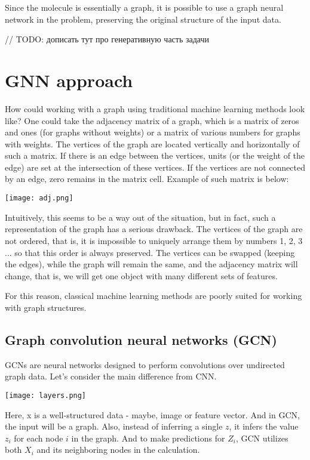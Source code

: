 \documentclass[a4paper,14pt]{article}
\begin{document}
Since the molecule is essentially a graph, it is possible to use a graph neural network in the problem, preserving the original structure of the input data.

// TODO: дописать тут про генеративную часть задачи

\section{GNN approach}

How could working with a graph using traditional machine learning methods look like? One could take the adjacency matrix of a graph, which is a matrix of zeros and ones (for graphs without weights) or a matrix of various numbers for graphs with weights. The vertices of the graph are located vertically and horizontally of such a matrix. If there is an edge between the vertices, units (or the weight of the edge) are set at the intersection of these vertices. If the vertices are not connected by an edge, zero remains in the matrix cell.
Example of such matrix is below:

\texttt{[image: adj.png]}

Intuitively, this seems to be a way out of the situation, but in fact, such a representation of the graph has a serious drawback. The vertices of the graph are not ordered, that is, it is impossible to uniquely arrange them by numbers 1, 2, 3 ... so that this order is always preserved. The vertices can be swapped (keeping the edges), while the graph will remain the same, and the adjacency matrix will change, that is, we will get one object with many different sets of features.

For this reason, classical machine learning methods are poorly suited for working with graph structures.

\subsection{Graph convolution neural networks (GCN)}
GCNs are neural networks designed to perform convolutions over undirected graph data. Let's consider the main difference from CNN.

\texttt{[image: layers.png]}

Here, x is a well-structured data - maybe, image or feature vector. And in GCN, the input will be a graph. Also, instead of inferring a single $z$, it infers the value $z_i$ for each node $i$ in the graph. And to make predictions for $Z_i$, GCN utilizes both $X_i$ and its neighboring nodes in the calculation.
\end{document}
